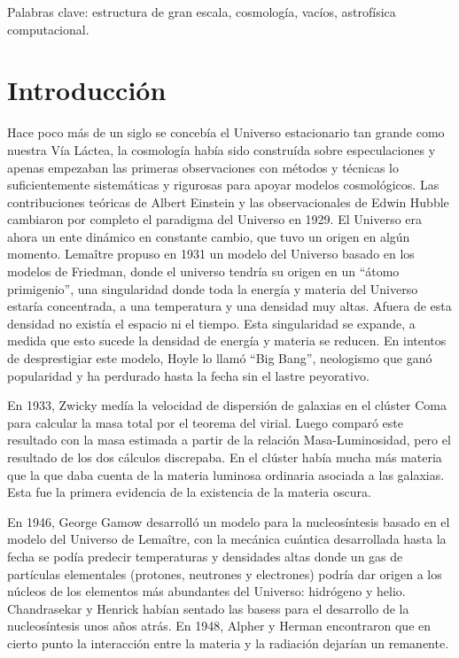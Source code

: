 \documentclass[preprint]{aastex62}
\begin{document}
  \medskip

  Palabras clave: estructura de gran escala, cosmología, vacíos,
  astrofísica computacional.


  \section{Introducción}

  Hace poco más de un siglo se concebía el Universo estacionario tan grande como nuestra
  Vía Láctea, la cosmología había sido construída sobre especulaciones y apenas empezaban
  las primeras observaciones con métodos y técnicas lo suficientemente sistemáticas y
  rigurosas para apoyar modelos cosmológicos.
  Las contribuciones teóricas de Albert Einstein y las observacionales de Edwin 
  Hubble cambiaron por completo el paradigma del Universo en 1929. El Universo era ahora un ente
  dinámico en constante cambio, que tuvo un origen en algún momento. Lemaître propuso
  en 1931  un modelo del Universo basado en los modelos de Friedman, donde el universo tendría
  su origen en un ``átomo primigenio'', una singularidad donde toda la energía y materia
  del Universo estaría concentrada, a una temperatura y una densidad muy altas. Afuera
  de esta densidad no existía el espacio ni el tiempo. Esta singularidad se expande,
  a medida que esto sucede la densidad de energía y materia se reducen.
  En intentos de desprestigiar este modelo, Hoyle lo llamó  ``Big Bang'',
  neologismo que ganó popularidad y ha perdurado hasta la fecha sin el lastre peyorativo.

  En 1933, Zwicky medía la velocidad de dispersión de galaxias en el clúster Coma
  para calcular la masa total por el teorema del virial. Luego comparó este resultado
  con la masa estimada a partir de la relación Masa-Luminosidad, pero el resultado de
  los dos cálculos discrepaba. En el clúster había mucha más materia que la que daba cuenta
  de la materia luminosa ordinaria  asociada a las galaxias. Esta fue la primera evidencia de la
  existencia de la materia oscura.

  En 1946, George Gamow desarrolló un modelo para la nucleosíntesis basado en el modelo
  del Universo de Lemaître, con la mecánica cuántica desarrollada hasta la fecha se
  podía predecir temperaturas y densidades altas donde un gas de partículas elementales
  (protones, neutrones y electrones) podría dar origen a los núcleos de los elementos
  más abundantes del Universo: hidrógeno y helio. Chandrasekar y Henrick habían sentado las
  basess para el desarrollo de la nucleosíntesis unos años atrás.  En 1948, Alpher y Herman
  encontraron que en cierto punto la interacción entre la materia y la radiación dejarían
  un remanente. 
  
\end{document}
